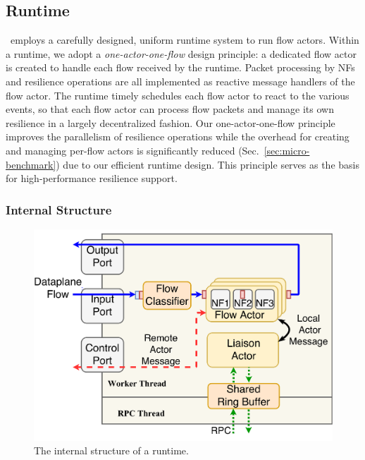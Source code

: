 \subsection{Runtime}
\label{sec:runtime}

\nfactor~employs a carefully designed, uniform runtime system to run flow actors. Within a runtime, we adopt a {\em one-actor-one-flow} design principle: a dedicated flow actor is created to handle each flow received by the runtime. Packet processing by NFs and resilience operations are all implemented as reactive message handlers of the flow actor. The runtime timely schedules each flow actor to react to the various events, so that each flow actor can process flow packets and manage its own resilience in a largely decentralized fashion. Our one-actor-one-flow principle improves the parallelism of resilience operations while the overhead for creating and managing per-flow actors is significantly reduced (Sec.~\ref{sec:micro-benchmark}) due to our efficient runtime design. This principle serves as the basis for high-performance resilience support.


\subsubsection{Internal Structure}

\begin{figure}
		\centering
		\includegraphics[width=\columnwidth]{chap-nfvactor/figure/new-nfactor-runtime-arch.pdf}
		\caption{The internal structure of a runtime.}
\label{fig:runtime-arch}
\end{figure}

